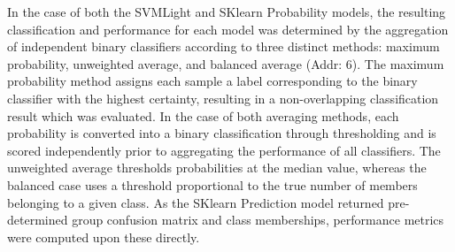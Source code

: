 In the case of both the SVMLight and SKlearn Probability models, the resulting classification and performance for each
model was determined by the aggregation of independent binary classifiers according to three distinct methods: maximum
probability, unweighted average, and balanced average (Addr: 6). The maximum probability method assigns each sample a
label corresponding to the binary classifier with the highest certainty, resulting in a non-overlapping classification
result which was evaluated. In the case of both averaging methods, each probability is converted into a  binary
classification through thresholding and is scored independently prior to aggregating the performance of all classifiers.
The unweighted average thresholds probabilities at the median value, whereas the balanced case uses a threshold
proportional to the true number of members belonging to a given class. As the SKlearn Prediction model returned
pre-determined group confusion matrix and class memberships, performance metrics were computed upon these directly.


